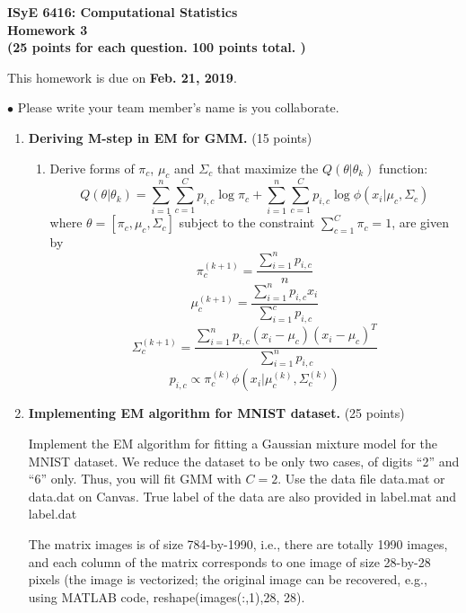 \documentclass[11pt]{article}
\begin{document}
\begin{center}
{\bf ISyE 6416: Computational Statistics}\\
{\bf Homework 3 \\ (25 points for each question. 100 points total. )}
\end{center}


\vspace{.2in} \noindent This homework is due on {\bf Feb. 21, 2019}. 

\vspace{.05in} \noindent $\bullet$ Please write your team member's name is you collaborate.

\vspace{.20in}

\begin{enumerate}



\item {\bf Deriving M-step in EM for GMM.} (15 points)
\begin{enumerate}
\item
Derive forms of $\pi_c$, $\mu_c$ and $\Sigma_c$ that maximize the $Q(\theta|\theta_k)$ function:
\[
Q(\theta|\theta_k) = \sum_{i=1}^n \sum_{c=1}^C p_{i, c} \log \pi_c
+ \sum_{i=1}^n \sum_{c=1}^C p_{i, c} \log \phi(x_i|\mu_c, \Sigma_c)
\] 
where $\theta= [\pi_c, \mu_c, \Sigma_c]$
subject to the constraint $\sum_{c = 1}^C \pi_{c} = 1$, are given by 
\[
\pi_c^{(k+1)} = \frac{\sum_{i=1}^n p_{i,c}}{n}
\]
\[
\mu_c^{(k+1)}  = \frac{\sum_{i=1}^n p_{i,c} x_i}{\sum_{i=1}^c p_{i,c}}
\]
\[
\Sigma_c^{(k+1)} = \frac{\sum_{i=1}^n p_{i,c} (x_i - \mu_c)(x_i - \mu_c)^T}{\sum_{i=1}^n p_{i,c}}
\]
\[
p_{i,c} \propto \pi_c^{(k)} \phi(x_i|\mu_c^{(k)}, \Sigma_c^{(k)})
\]

\end{enumerate}

\item {\bf Implementing EM algorithm for MNIST dataset.} (25 points)

 Implement the EM algorithm for fitting a Gaussian mixture model for the MNIST dataset. We reduce the dataset to be only two cases, of digits ``2'' and ``6'' only. Thus, you will fit GMM with $C = 2$. Use the data file \textsf{data.mat} or \textsf{data.dat} on Canvas. True label of the data are also provided in \textsf{label.mat} and \textsf{label.dat}

The matrix \textsf{images} is of size 784-by-1990, i.e., there are totally 1990 images, and each column of the matrix corresponds to one image of size 28-by-28 pixels (the image is vectorized; the original image can be recovered, e.g., using MATLAB code, \textsf{reshape(images(:,1),28, 28)}.



\end{enumerate}
\end{document}

